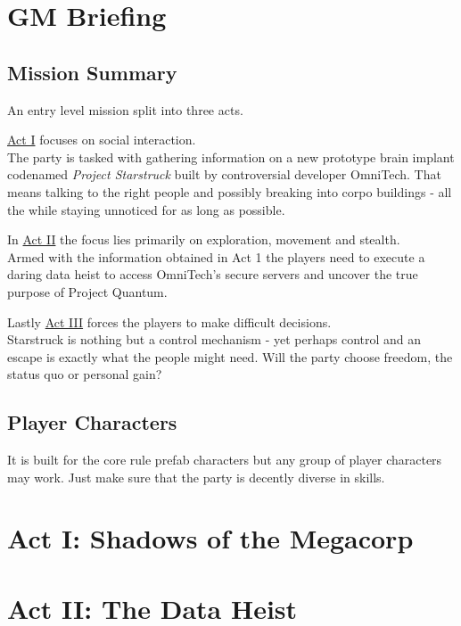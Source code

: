\documentclass[12pt,a4paper,openany]{book}
\begin{document}
	
	
	\chapter{GM Briefing}
	\section{Mission Summary}
	An entry level mission split into three acts.
	\par
		\hyperref[ch:act1]{Act I} focuses on social interaction.\\
		The party is tasked with gathering information on a new prototype brain implant codenamed \emph{Project Starstruck} built by controversial developer OmniTech.
		That means talking to the right people and possibly breaking into corpo buildings
		- all the while staying unnoticed for as long as possible.
	\par
		In \hyperref[ch:act2]{Act II} the focus lies primarily on exploration, movement and stealth.\\
		Armed with the information obtained in Act 1 the players need to execute a daring data heist to access OmniTech's secure servers and uncover the true purpose of Project Quantum.
	\par
		Lastly \hyperref[ch:act3]{Act III} forces the players to make difficult decisions.\\
		Starstruck is nothing but a control mechanism
		- yet perhaps control and an escape is exactly what the people might need.
		Will the party choose freedom, the status quo or personal gain?
	\section{Player Characters}
	It is built for the core rule prefab characters but any group of player characters may work.
	Just make sure that the party is decently diverse in skills.
	
	\chapter{Act I: Shadows of the Megacorp}
	\label{ch:act1}
	
	\chapter{Act II: The Data Heist}
	\label{ch:act2}
	
\end{document}
